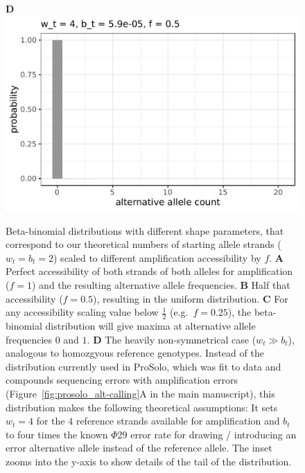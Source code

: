 \documentclass[authoryear,preprint,11pt]{scrartcl}
\begin{document}
\begin{figure}[!tpb]
\begin{minipage}[t]{.47\linewidth}
  \textbf{D}\\
  \includegraphics[width=.95\linewidth]{figs/Beta_binom_cov-20_w-4_b-5-9e-05_f-0-5.pdf}
 \end{minipage}
 \caption{
  Beta-binomial distributions with different shape parameters, that correspond to our theoretical numbers of starting allele strands ($w_t = b_t = 2$) scaled to different amplification accessibility by $f$.
  \textbf{A} Perfect accessibility of both strands of both alleles for amplification ($f = 1$) and the resulting alternative allele frequencies.
  \textbf{B} Half that accessibility ($f = 0.5$), resulting in the uniform distribution.
  \textbf{C} For any accessibility scaling value below $\frac{1}{2}$ (e.g.~$f = 0.25$), the beta-binomial distribution will give maxima at alternative allele frequencies $0$ and $1$.
  \textbf{D} The heavily non-symmetrical case ($w_t \gg b_t$), analogous to homozgyous reference genotypes.
  Instead of the distribution currently used in ProSolo, which was fit to data and compounds sequencing errors with amplification errors (Figure~\ref{fig:prosolo_alt-calling}A in the main manuscript), this distribution makes the following theoretical assumptions:
  It sets $w_t = 4$ for the $4$ reference strands available for amplification and $b_t$ to four times the known $\Phi$29 error rate for drawing / introducing an error alternative allele instead of the reference allele.
  The inset zooms into the y-axis to show details of the tail of the distribution.}
 \label{fig:beta-binomials}
\end{figure}
\end{document}
